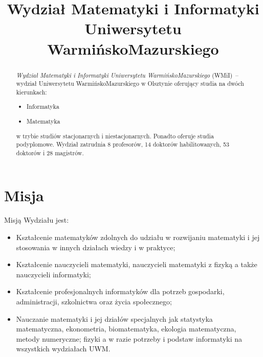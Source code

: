 \documentclass[a4paper,12pt]{article}
\title{Wydział Matematyki i Informatyki Uniwersytetu Warmińsko{\dywiz}Mazurskiego}
\author{}
\begin{document}
\maketitle

\begin{abstract}
\emph {Wydział Matematyki i Informatyki Uniwersytetu Warmińsko{\dywiz}Mazurskiego} (WMiI)~-- wydział Uniwersytetu Warmińsko{\dywiz}Mazurskiego w Olsztynie oferujący studia na dwóch kierunkach:
\begin{itemize}
\item Informatyka
\item Matematyka
\end{itemize}
w trybie studiów stacjonarnych i niestacjonarnych. Ponadto oferuje studia podyplomowe.
Wydział zatrudnia 8 profesorów, 14 doktorów habilitowanych, 53 
doktorów i 28 magistrów.
\end{abstract}
\tableofcontents
\section{Misja}
Misją Wydziału jest:
\begin{itemize}
\item Kształcenie matematyków zdolnych do udziału w rozwijaniu matematyki i jej stosowania w innych
działach wiedzy i w praktyce;
\item Kształcenie nauczycieli matematyki, nauczycieli matematyki z fizyką a także nauczycieli informatyki;
\item Kształcenie profesjonalnych informatyków dla potrzeb gospodarki, administracji, szkolnictwa oraz życia
społecznego;
\item Nauczanie matematyki i jej działów specjalnych jak statystyka matematyczna, ekonometria,
biomatematyka, ekologia matematyczna, metody numeryczne; fizyki a w razie potrzeby i podstaw
informatyki na wszystkich wydziałach UWM.
\end{itemize}
\end{document}
